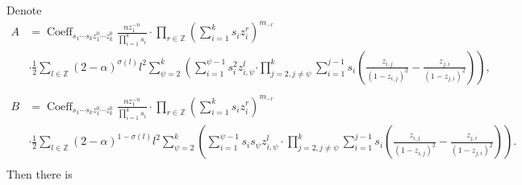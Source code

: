 \documentclass{article}
\newcommand{\lr}[1]{\left({#1}\right)}
\DeclareMathOperator{\Coeff}{Coeff}
\begin{document}
Denote
\[
\begin{aligned}
A &= \Coeff_{s_1 \cdots s_{k} z_1^{0} \cdots z^0_{k} } \frac{n z_1^{-n}}{\prod_{i=1}^k s_i}\cdot\prod_{r\in\mathbb{Z}}\lr{\sum_{i=1}^k s_i z_i^r}^{m_{-r}}\\
&\cdot\frac12\sum_{l\in\mathbb{Z}}(2-\alpha)^{\sigma(l)}l^2\sum_{\psi=2}^k\left(\sum_{i=1}^{\psi-1} s_i^2 z_{i,\psi}^l\right.\left.\cdot\prod_{j=2,j\neq\psi}^k \sum_{i=1}^{j-1} s_i \left( \frac{z_{i,j}}{(1 - z_{i,j})^2} - \frac{z_{j,i}}{(1 - z_{j,i})^2} \right)\right),\\
\\
B &= \Coeff_{s_1 \cdots s_{k} z_1^{0} \cdots z^0_{k} } \frac{n z_1^{-n}}{\prod_{i=1}^k s_i}\cdot\prod_{r\in\mathbb{Z}}\lr{\sum_{i=1}^k s_i z_i^r}^{m_{-r}}\\
&\cdot\frac12\sum_{l\in\mathbb{Z}}(2-\alpha)^{1-\sigma(l)}l^2\sum_{\psi=2}^k\left(\sum_{i=1}^{\psi-1}s_is_\psi z_{i,\psi}^l\cdot\prod_{j=2,j\neq\psi}^k \sum_{i=1}^{j-1} s_i \left( \frac{z_{i,j}}{(1 - z_{i,j})^2} - \frac{z_{j,i}}{(1 - z_{j,i})^2} \right)\right).\\
\end{aligned}
\]
Then there is
\end{document}
